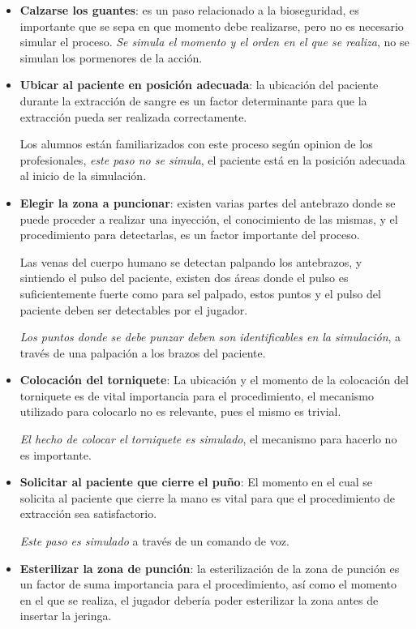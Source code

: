 \begin{itemize}
\item \textbf{Calzarse los guantes}: es un paso relacionado a la bioseguridad,
    es importante que se sepa en que momento debe realizarse, pero no es
    necesario simular el proceso. 
    \emph{Se simula el momento y el orden en el que se realiza}, no se simulan
    los pormenores de la acción.

\item \textbf{Ubicar al paciente en posición adecuada}: la ubicación del
    paciente durante la extracción de sangre es un factor determinante para que
    la extracción pueda ser realizada correctamente.

    Los alumnos están familiarizados con este proceso según opinion de los
    profesionales, \emph{este paso no se simula}, el paciente está en la
    posición adecuada al inicio de la simulación.

\item \textbf{Elegir la zona a puncionar}: existen varias partes del antebrazo
    donde se puede proceder a realizar una inyección, el conocimiento de las
    mismas, y el procedimiento para detectarlas, es un factor importante del
    proceso.
    
    Las venas del cuerpo humano se detectan palpando los antebrazos, y sintiendo
    el pulso del paciente, existen dos áreas donde el pulso es suficientemente
    fuerte como para sel palpado, estos puntos y el pulso del paciente deben ser
    detectables por el jugador.

    \emph{Los puntos donde se debe punzar deben son identificables en la
        simulación}, a través de una palpación a los brazos del paciente. 

\item \textbf{Colocación del torniquete}: La ubicación y el momento de la
    colocación del torniquete es de vital importancia para el procedimiento, el
    mecanismo utilizado para colocarlo no es relevante, pues el mismo es
    trivial.

    \emph{El hecho de colocar el torniquete es simulado}, el mecanismo para
    hacerlo no es importante.

\item \textbf{Solicitar al paciente que cierre el puño}: El momento en el cual
    se solicita al paciente que cierre la mano es vital para que el
    procedimiento de extracción sea satisfactorio.

    \emph{Este paso es simulado} a través de un comando de voz.

\item \textbf{Esterilizar la zona de punción}: la esterilización de la zona de
    punción es un factor de suma importancia para el procedimiento, así como el
    momento en el que se realiza, el jugador debería poder esterilizar la zona
    antes de insertar la jeringa.
    

\end{itemize}
